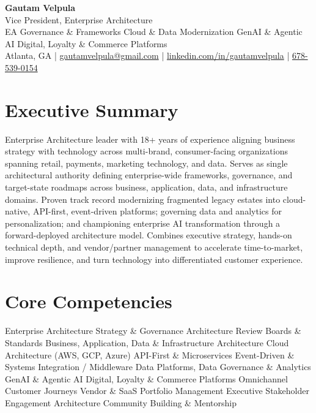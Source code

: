 \documentclass[11pt]{article}
\begin{document}
\begin{center}
    {\LARGE \textbf{Gautam Velpula}} \\[4pt]
    Vice President, Enterprise Architecture \\[6pt]
    EA Governance \& Frameworks \textbullet{} Cloud \& Data Modernization \textbullet{} GenAI \& Agentic AI \textbullet{} Digital, Loyalty \& Commerce Platforms \\[6pt]
    Atlanta, GA \;|\;
    \href{mailto:gautamvelpula@gmail.com}{gautamvelpula@gmail.com} \;|\;
    \href{https://www.linkedin.com/in/gautamvelpula}{linkedin.com/in/gautamvelpula} \;|\;
    \href{tel:6785390154}{678-539-0154}
\end{center}

\vspace{8pt}

\section*{Executive Summary}
Enterprise Architecture leader with 18+ years of experience aligning business strategy with technology across multi-brand, consumer-facing organizations spanning retail, payments, marketing technology, and data. Serves as single architectural authority defining enterprise-wide frameworks, governance, and target-state roadmaps across business, application, data, and infrastructure domains. Proven track record modernizing fragmented legacy estates into cloud-native, API-first, event-driven platforms; governing data and analytics for personalization; and championing enterprise AI transformation through a forward-deployed architecture model. Combines executive strategy, hands-on technical depth, and vendor/partner management to accelerate time-to-market, improve resilience, and turn technology into differentiated customer experience.

\section*{Core Competencies}
Enterprise Architecture Strategy \& Governance \textbullet{} Architecture Review Boards \& Standards \textbullet{} Business, Application, Data \& Infrastructure Architecture \textbullet{} Cloud Architecture (AWS, GCP, Azure) \textbullet{} API-First \& Microservices \textbullet{} Event-Driven \& Systems Integration / Middleware \textbullet{} Data Platforms, Data Governance \& Analytics \textbullet{} GenAI \& Agentic AI \textbullet{} Digital, Loyalty \& Commerce Platforms \textbullet{} Omnichannel Customer Journeys \textbullet{} Vendor \& SaaS Portfolio Management \textbullet{} Executive Stakeholder Engagement \textbullet{} Architecture Community Building \& Mentorship
\end{document}
